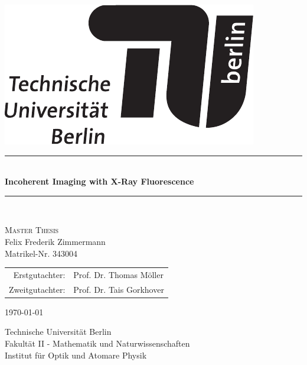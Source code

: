 \begin{titlepage}
		
	\begin{center}
				
				
		\begin{flushright}
			\includegraphics[width=.3\textwidth]{images/TU_Logo.pdf}\\[2.5cm]    
			\end{flushright}
					
					
			{\newcommand{\HRule}{\rule{\linewidth}{0.5mm}}
				\HRule \\[0.4cm]
				\LARGE{\bfseries Incoherent Imaging with X-Ray Fluorescence}\\
							
				\HRule \\[1.5cm]}
			\textsc{\Large Master Thesis}\\[0.5cm]
					
			
			Felix Frederik Zimmermann\\
			Matrikel-Nr. 343004\\[0.5cm]
			
			\begin{table}[h]
				\centering
				\begin{tabular}{rl}
					Erstgutachter:& Prof. Dr. Thomas Möller\\
					Zweitgutachter:& Prof. Dr. Tais Gorkhover\\
				\end{tabular}
			\end{table}		
			{\large \today}
			
			\vfill
					
			Technische Universität Berlin\\
			Fakultät II - Mathematik und Naturwissenschaften\\
			Institut für Optik und Atomare Physik\\					
		\end{center}
			
	\end{titlepage}

